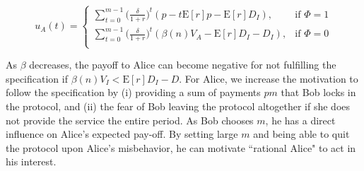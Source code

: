 \documentclass[runningheads]{llncs}
\begin{document}
\begin{equation}
\label{eq:beta_alice}
u_A(t) = 
\begin{cases}
    \sum_{t=0}^{m-1} \big( \frac{\delta}{1+r} \big)^{t} ( p - t\mathrm{E}[r]p -\mathrm{E}[r]D_{I}), & \text{if $\Phi=1$} \\
    \sum_{t=0}^{m-1} \big( \frac{\delta}{1+r} \big)^{t} (\beta(n) V_A - \mathrm{E}[r]D_{I}-D_{I}), & \text{if $\Phi=0$} \\
\end{cases}
\end{equation}



As $\beta$ decreases, the payoff to Alice can become negative for not fulfilling the specification if $\beta(n) V_I < \mathrm{E}[r]D_I - D$.
For Alice, we increase the motivation to follow the specification by (i) providing a sum of payments $pm$ that Bob locks in the protocol, and (ii) the fear of Bob leaving the protocol altogether if she does not provide the service the entire period. %
As Bob chooses $m$, he has a direct influence on Alice's expected pay-off.
By setting large $m$ and being able to quit the protocol upon Alice's misbehavior, he can motivate ``rational Alice" to act in his interest.
\end{document}
